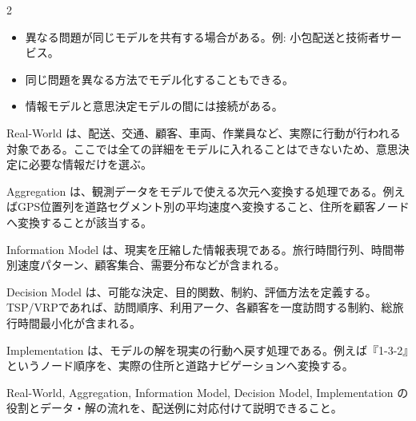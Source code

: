 \begin{multicols}{2}

\footnotesize

\raggedcolumns


\begin{itemize}
\item 異なる問題が同じモデルを共有する場合がある。例: 小包配送と技術者サービス。
\item 同じ問題を異なる方法でモデル化することもできる。
\item 情報モデルと意思決定モデルの間には接続がある。
\end{itemize}

Real-World は、配送、交通、顧客、車両、作業員など、実際に行動が行われる対象である。ここでは全ての詳細をモデルに入れることはできないため、意思決定に必要な情報だけを選ぶ。\par

Aggregation は、観測データをモデルで使える次元へ変換する処理である。例えばGPS位置列を道路セグメント別の平均速度へ変換すること、住所を顧客ノードへ変換することが該当する。\par

Information Model は、現実を圧縮した情報表現である。旅行時間行列、時間帯別速度パターン、顧客集合、需要分布などが含まれる。\par

Decision Model は、可能な決定、目的関数、制約、評価方法を定義する。TSP/VRPであれば、訪問順序、利用アーク、各顧客を一度訪問する制約、総旅行時間最小化が含まれる。\par

Implementation は、モデルの解を現実の行動へ戻す処理である。例えば『1-3-2』というノード順序を、実際の住所と道路ナビゲーションへ変換する。\par

Real-World, Aggregation, Information Model, Decision Model, Implementation の役割とデータ・解の流れを、配送例に対応付けて説明できること。\par


\end{multicols}

